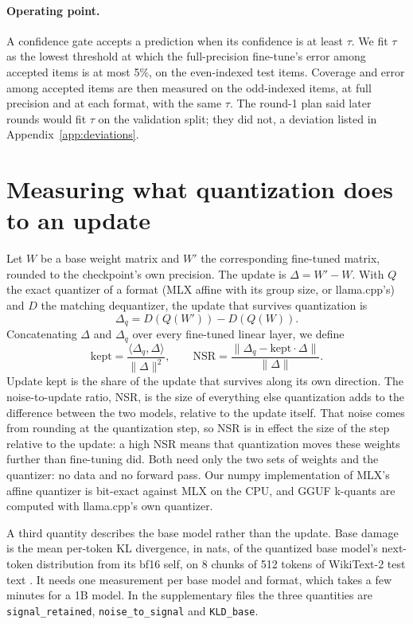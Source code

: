 \documentclass[10pt]{article}
\begin{document}
\paragraph{Operating point.} A confidence gate accepts a prediction when its confidence is at least $\tau$. We fit $\tau$ as the lowest threshold at which the full-precision fine-tune's error among accepted items is at most 5\%, on the even-indexed test items. Coverage and error among accepted items are then measured on the odd-indexed items, at full precision and at each format, with the same $\tau$. The round-1 plan said later rounds would fit $\tau$ on the validation split; they did not, a deviation listed in Appendix~\ref{app:deviations}.

\section{Measuring what quantization does to an update}
\label{sec:mechanism}

Let $W$ be a base weight matrix and $W'$ the corresponding fine-tuned matrix, rounded to the checkpoint's own precision. The update is $\Delta = W' - W$. With $Q$ the exact quantizer of a format (MLX affine with its group size, or llama.cpp's) and $D$ the matching dequantizer, the update that survives quantization is
\begin{equation}
\Delta_q = D(Q(W')) - D(Q(W)).
\end{equation}
Concatenating $\Delta$ and $\Delta_q$ over every fine-tuned linear layer, we define
\begin{equation}
\mathrm{kept} = \frac{\langle \Delta_q, \Delta \rangle}{\lVert \Delta \rVert^2},
\qquad
\mathrm{NSR} = \frac{\lVert \Delta_q - \mathrm{kept}\cdot\Delta \rVert}{\lVert \Delta \rVert}.
\end{equation}
Update kept is the share of the update that survives along its own direction. The noise-to-update ratio, NSR, is the size of everything else quantization adds to the difference between the two models, relative to the update itself. That noise comes from rounding at the quantization step, so NSR is in effect the size of the step relative to the update: a high NSR means that quantization moves these weights further than fine-tuning did. Both need only the two sets of weights and the quantizer: no data and no forward pass. Our numpy implementation of MLX's affine quantizer is bit-exact against MLX on the CPU, and GGUF k-quants are computed with llama.cpp's own quantizer.

A third quantity describes the base model rather than the update. Base damage is the mean per-token KL divergence, in nats, of the quantized base model's next-token distribution from its bf16 self, on 8 chunks of 512 tokens of WikiText-2 test text \citep{merity2017wikitext}. It needs one measurement per base model and format, which takes a few minutes for a 1B model. In the supplementary files the three quantities are \texttt{signal\_retained}, \texttt{noise\_to\_signal} and \texttt{KLD\_base}.
\end{document}

